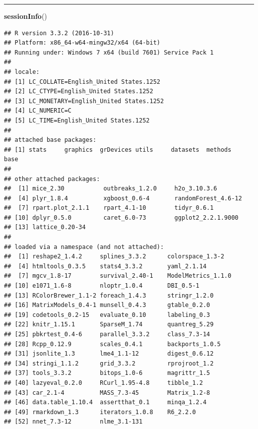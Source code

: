 \documentclass[]{article}
\newenvironment{Shaded}{\begin{snugshade}}{\end{snugshade}}
\newcommand{\KeywordTok}[1]{\textcolor[rgb]{0.13,0.29,0.53}{\textbf{{#1}}}}
\newcommand{\NormalTok}[1]{{#1}}
\begin{document}
\begin{center}\rule{0.5\linewidth}{\linethickness}\end{center}

\begin{Shaded}
\begin{Highlighting}[]
\KeywordTok{sessionInfo}\NormalTok{()}
\end{Highlighting}
\end{Shaded}

\begin{verbatim}
## R version 3.3.2 (2016-10-31)
## Platform: x86_64-w64-mingw32/x64 (64-bit)
## Running under: Windows 7 x64 (build 7601) Service Pack 1
## 
## locale:
## [1] LC_COLLATE=English_United States.1252 
## [2] LC_CTYPE=English_United States.1252   
## [3] LC_MONETARY=English_United States.1252
## [4] LC_NUMERIC=C                          
## [5] LC_TIME=English_United States.1252    
## 
## attached base packages:
## [1] stats     graphics  grDevices utils     datasets  methods   base     
## 
## other attached packages:
##  [1] mice_2.30           outbreaks_1.2.0     h2o_3.10.3.6       
##  [4] plyr_1.8.4          xgboost_0.6-4       randomForest_4.6-12
##  [7] rpart.plot_2.1.1    rpart_4.1-10        tidyr_0.6.1        
## [10] dplyr_0.5.0         caret_6.0-73        ggplot2_2.2.1.9000 
## [13] lattice_0.20-34    
## 
## loaded via a namespace (and not attached):
##  [1] reshape2_1.4.2     splines_3.3.2      colorspace_1.3-2  
##  [4] htmltools_0.3.5    stats4_3.3.2       yaml_2.1.14       
##  [7] mgcv_1.8-17        survival_2.40-1    ModelMetrics_1.1.0
## [10] e1071_1.6-8        nloptr_1.0.4       DBI_0.5-1         
## [13] RColorBrewer_1.1-2 foreach_1.4.3      stringr_1.2.0     
## [16] MatrixModels_0.4-1 munsell_0.4.3      gtable_0.2.0      
## [19] codetools_0.2-15   evaluate_0.10      labeling_0.3      
## [22] knitr_1.15.1       SparseM_1.74       quantreg_5.29     
## [25] pbkrtest_0.4-6     parallel_3.3.2     class_7.3-14      
## [28] Rcpp_0.12.9        scales_0.4.1       backports_1.0.5   
## [31] jsonlite_1.3       lme4_1.1-12        digest_0.6.12     
## [34] stringi_1.1.2      grid_3.3.2         rprojroot_1.2     
## [37] tools_3.3.2        bitops_1.0-6       magrittr_1.5      
## [40] lazyeval_0.2.0     RCurl_1.95-4.8     tibble_1.2        
## [43] car_2.1-4          MASS_7.3-45        Matrix_1.2-8      
## [46] data.table_1.10.4  assertthat_0.1     minqa_1.2.4       
## [49] rmarkdown_1.3      iterators_1.0.8    R6_2.2.0          
## [52] nnet_7.3-12        nlme_3.1-131
\end{verbatim}
\end{document}
